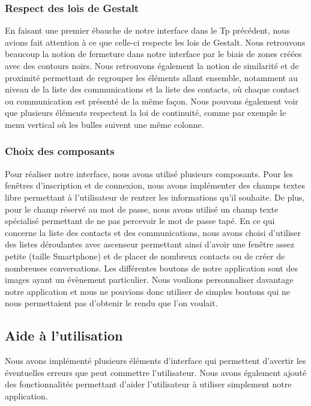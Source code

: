 \documentclass[11pt]{article}
\begin{document}
\subsubsection{Respect des lois de Gestalt}
En faisant une premier ébauche de notre interface dans le Tp précédent, nous avions fait attention à ce que celle-ci respecte les lois de Gestalt. Nous retrouvons beaucoup la notion de fermeture dans notre interface par le biais de zones créées avec des contours noirs. Nous retrouvons également la notion de similarité et de proximité permettant de regrouper les éléments allant ensemble, notamment au niveau de la liste des communications et la liste des contacts, où chaque contact ou communication est présenté de la même façon. Nous pouvons également voir que plusieurs éléments respectent la loi de continuité, comme par exemple le menu vertical où les bulles suivent une même colonne.

\subsubsection{Choix des composants}
Pour réaliser notre interface, nous avons utilisé plusieurs composants. Pour les fenêtres d'inscription et de connexion, nous avons implémenter des champs textes libre permettant à l'utilisateur de rentrer les informations qu'il souhaite. De plus, pour le champ réservé au mot de passe, nous avons utilisé un champ texte spécialisé permettant de ne pas percevoir le mot de passe tapé. En ce qui concerne la liste des contacts et des communications, nous avons choisi d'utiliser des listes déroulantes avec ascenseur permettant ainsi d'avoir une fenêtre assez petite (taille Smartphone) et de placer de nombreux contacts ou de créer de nombreuses conversations. Les différentes boutons de notre application sont des images ayant un évènement particulier. Nous voulions personnaliser davantage notre application et nous ne pouvions donc utiliser de simples boutons qui ne nous permettaient pas d'obtenir le rendu que l'on voulait.

\subsection{Aide à l'utilisation}
Nous avons implémenté plusieurs éléments d'interface qui permettent d'avertir les éventuelles erreurs que peut commettre l'utilisateur. Nous avons également ajouté des fonctionnalités permettant d'aider l'utilisateur à utiliser simplement notre application.
\end{document}
